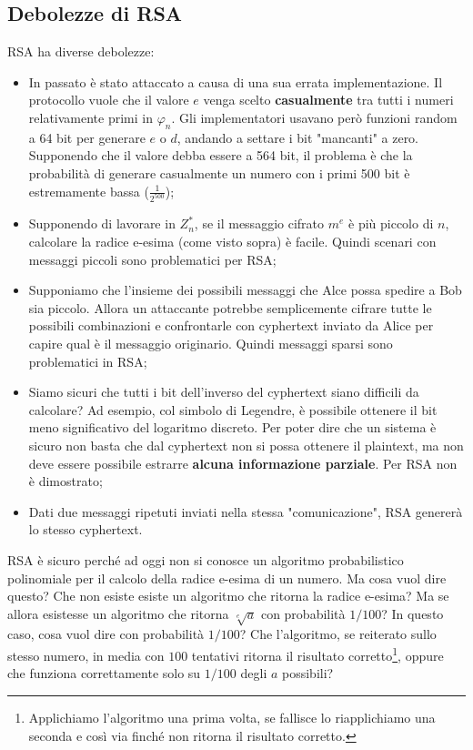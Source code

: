 \subsection{Debolezze di RSA}
RSA ha diverse debolezze:
\begin{itemize}
    \item In passato è stato attaccato a causa di una sua errata implementazione. Il protocollo vuole che il valore $e$ venga scelto \textbf{casualmente} tra tutti i numeri relativamente primi in $\varphi_n$. Gli implementatori usavano però funzioni random a 64 bit per generare $e$ o $d$, andando a settare i bit "mancanti" a zero. Supponendo che il valore debba essere a 564 bit, il problema è che la probabilità di generare casualmente un numero con i primi 500 bit è estremamente bassa ($\frac{1}{2^{500}}$);
    \item Supponendo di lavorare in $Z_n^*$, se il messaggio cifrato $m^e$ è più piccolo di $n$, calcolare la radice e-esima (come visto sopra) è facile. Quindi scenari con messaggi piccoli sono problematici per RSA;
    \item Supponiamo che l'insieme dei possibili messaggi che Alce possa spedire a Bob sia piccolo. Allora un attaccante potrebbe semplicemente cifrare tutte le possibili combinazioni e confrontarle con cyphertext inviato da Alice per capire qual è il messaggio originario. Quindi messaggi sparsi sono problematici in RSA;
    \item Siamo sicuri che tutti i bit dell'inverso del cyphertext siano difficili da calcolare? Ad esempio, col simbolo di Legendre, è possibile ottenere il bit meno significativo del logaritmo discreto. Per poter dire che un sistema è sicuro non basta che dal cyphertext non si possa ottenere il plaintext, ma non deve essere possibile estrarre \textbf{alcuna informazione parziale}. Per RSA non è dimostrato;
    \item Dati due messaggi ripetuti inviati nella stessa "comunicazione", RSA genererà lo stesso cyphertext. 
\end{itemize}

\noindent RSA è sicuro perché ad oggi non si conosce un algoritmo probabilistico polinomiale per il calcolo della radice e-esima di un numero. Ma cosa vuol dire questo? Che non esiste esiste un algoritmo che ritorna la radice e-esima? Ma se allora esistesse un algoritmo che ritorna $\sqrt[e]{a}$ con probabilità $1 / 100$? In questo caso, cosa vuol dire con probabilità $1 / 100$? Che l'algoritmo, se reiterato sullo stesso numero, in media con $100$ tentativi ritorna il risultato corretto\footnote{Applichiamo l'algoritmo una prima volta, se fallisce lo riapplichiamo una seconda e così via finché non ritorna il risultato corretto.}, oppure che funziona correttamente solo su $1 / 100$ degli $a$ possibili? 

